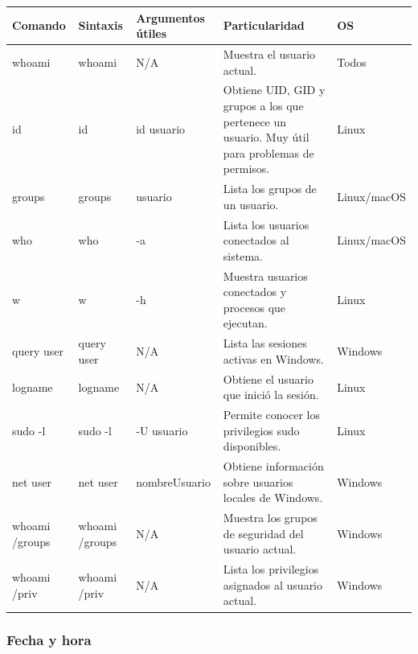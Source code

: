 \documentclass[a4paper,10pt]{article}
\begin{document}
\begin{longtable}{|p{2.8cm}|p{3.1cm}|p{4.3cm}|p{5.5cm}|p{1.5cm}|}

\hline
Comando &
Sintaxis &
Argumentos útiles &
Particularidad &
OS
\\
\hline
\endhead

whoami &
whoami &
N/A &
Muestra el usuario actual. &
Todos
\\
\hline

id &
id &
id usuario &
Obtiene UID, GID y grupos a los que pertenece un usuario. Muy útil para problemas de permisos. &
Linux
\\
\hline

groups &
groups &
usuario &
Lista los grupos de un usuario. &
Linux/macOS
\\
\hline

who &
who &
-a &
Lista los usuarios conectados al sistema. &
Linux/macOS
\\
\hline

w &
w &
-h &
Muestra usuarios conectados y procesos que ejecutan. &
Linux
\\
\hline

query user &
query user &
N/A &
Lista las sesiones activas en Windows. &
Windows
\\
\hline

logname &
logname &
N/A &
Obtiene el usuario que inició la sesión. &
Linux
\\
\hline

sudo -l &
sudo -l &
-U usuario &
Permite conocer los privilegios sudo disponibles. &
Linux
\\
\hline

net user &
net user &
nombreUsuario &
Obtiene información sobre usuarios locales de Windows. &
Windows
\\
\hline

whoami /groups &
whoami /groups &
N/A &
Muestra los grupos de seguridad del usuario actual. &
Windows
\\
\hline

whoami /priv &
whoami /priv &
N/A &
Lista los privilegios asignados al usuario actual. &
Windows
\\
\hline

\end{longtable}


\subsubsection{Fecha y hora}
\end{document}
